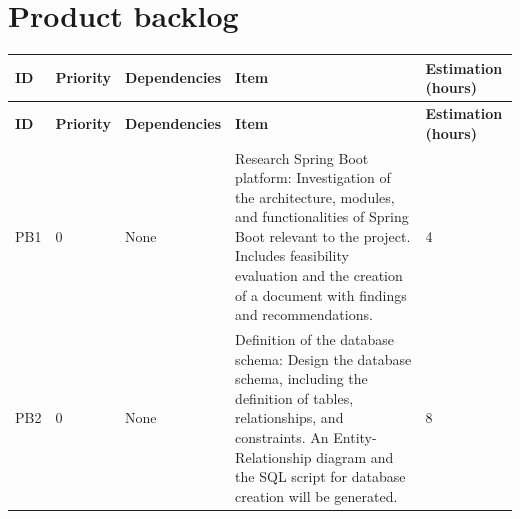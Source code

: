 \documentclass{scrreprt}
\begin{document}
\section{Product backlog}
\begin{longtable}{|p{0.8cm}|p{1.5cm}|p{2.5cm}|p{8cm}|p{2cm}|} \hline
	\textbf{ID} & \textbf{Priority} & \textbf{Dependencies} & \textbf{Item} & \textbf{Estimation (hours)} \\ \hline
	\endfirsthead
	\hline
	\textbf{ID} & \textbf{Priority} & \textbf{Dependencies} & \textbf{Item} & \textbf{Estimation (hours)} \\ \hline
	\endhead
	PB1 & 0 & None & Research Spring Boot  platform: Investigation of the architecture, modules, and functionalities of Spring Boot relevant to the project. Includes feasibility evaluation and the creation of a document with findings and recommendations. & 4 \\ \hline
	PB2 & 0 & None & Definition of the database schema: Design the database schema, including the definition of tables, relationships, and constraints. An Entity-Relationship diagram and the SQL script for database creation will be generated. & 8 \\ \hline
	
	

\end{longtable}
\end{document}

